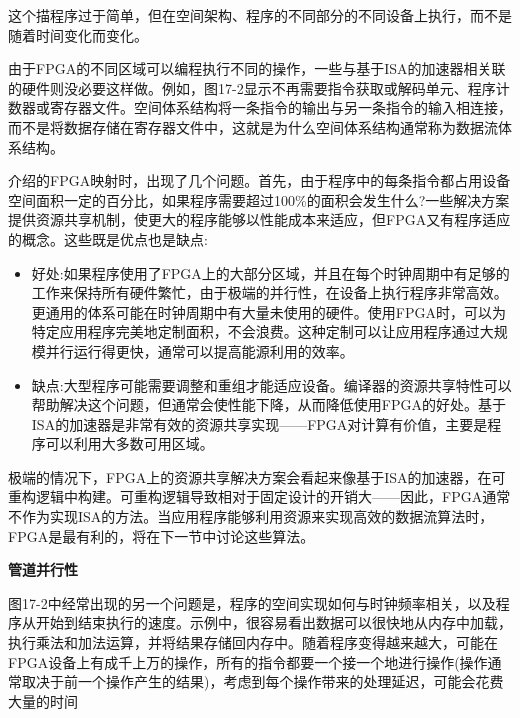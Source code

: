 这个描程序过于简单，但在空间架构、程序的不同部分的不同设备上执行，而不是随着时间变化而变化。\par

由于FPGA的不同区域可以编程执行不同的操作，一些与基于ISA的加速器相关联的硬件则没必要这样做。例如，图17-2显示不再需要指令获取或解码单元、程序计数器或寄存器文件。空间体系结构将一条指令的输出与另一条指令的输入相连接，而不是将数据存储在寄存器文件中，这就是为什么空间体系结构通常称为数据流体系结构。\par

介绍的FPGA映射时，出现了几个问题。首先，由于程序中的每条指令都占用设备空间面积一定的百分比，如果程序需要超过100\%的面积会发生什么?一些解决方案提供资源共享机制，使更大的程序能够以性能成本来适应，但FPGA又有程序适应的概念。这些既是优点也是缺点:\par

\begin{itemize}
	\item 好处:如果程序使用了FPGA上的大部分区域，并且在每个时钟周期中有足够的工作来保持所有硬件繁忙，由于极端的并行性，在设备上执行程序非常高效。更通用的体系可能在时钟周期中有大量未使用的硬件。使用FPGA时，可以为特定应用程序完美地定制面积，不会浪费。这种定制可以让应用程序通过大规模并行运行得更快，通常可以提高能源利用的效率。
	\item 缺点:大型程序可能需要调整和重组才能适应设备。编译器的资源共享特性可以帮助解决这个问题，但通常会使性能下降，从而降低使用FPGA的好处。基于ISA的加速器是非常有效的资源共享实现——FPGA对计算有价值，主要是程序可以利用大多数可用区域。
\end{itemize}

极端的情况下，FPGA上的资源共享解决方案会看起来像基于ISA的加速器，在可重构逻辑中构建。可重构逻辑导致相对于固定设计的开销大——因此，FPGA通常不作为实现ISA的方法。当应用程序能够利用资源来实现高效的数据流算法时，FPGA是最有利的，将在下一节中讨论这些算法。\par

\hspace*{\fill} \par %
\textbf{管道并行性}

图17-2中经常出现的另一个问题是，程序的空间实现如何与时钟频率相关，以及程序从开始到结束执行的速度。示例中，很容易看出数据可以很快地从内存中加载，执行乘法和加法运算，并将结果存储回内存中。随着程序变得越来越大，可能在FPGA设备上有成千上万的操作，所有的指令都要一个接一个地进行操作(操作通常取决于前一个操作产生的结果)，考虑到每个操作带来的处理延迟，可能会花费大量的时间\par


